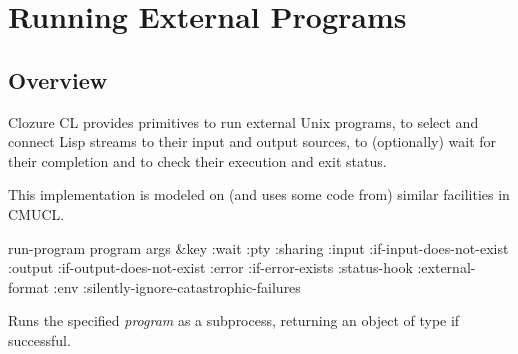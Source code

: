 \chapter{Running External Programs}

\section{Overview}

Clozure CL provides primitives to run external Unix programs, to
select and connect Lisp streams to their input and output sources, to
(optionally) wait for their completion and to check their execution
and exit status.

This implementation is modeled on (and uses some code from) similar
facilities in CMUCL.

\begin{defun}[Function]
run-program program args &key :wait :pty
:sharing :input :if-input-does-not-exist
:output :if-output-does-not-exist :error :if-error-exists
:status-hook :external-format :env :silently-ignore-catastrophic-failures

Runs the specified {\it program} as a subprocess, returning
an object of type  if successful.
\end{defun}
